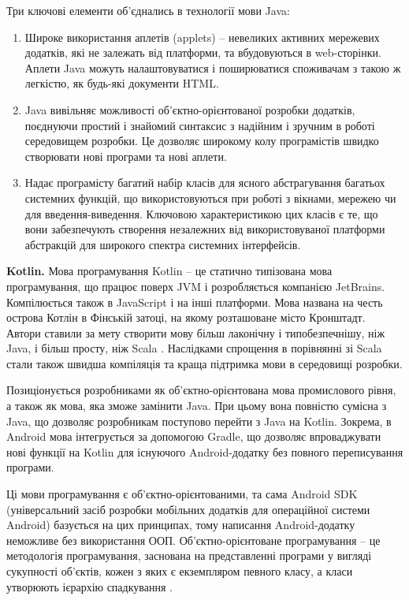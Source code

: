\documentclass[../main.tex]{subfiles}
\begin{document}
Три ключові елементи об'єднались в технології мови Java:
\begin{enumerate}
	\item Широке використання аплетів (applets) -- невеликих активних мережевих додатків, які не залежать від платформи, та вбудовуються в web-сторінки. Аплети Java можуть налаштовуватися і поширюватися споживачам з такою ж легкістю, як будь-які документи HTML.
	\item Java вивільняє можливості об'єктно-орієнтованої розробки додатків, поєднуючи простий і знайомий синтаксис з надійним і зручним в роботі середовищем розробки. Це дозволяє широкому колу програмістів швидко створювати нові програми та нові аплети.
	\item Надає програмісту багатий набір класів для ясного абстрагування багатьох системних функцій, що використовуються при роботі з вікнами, мережею чи для введення-виведення. Ключовою характеристикою цих класів є те, що вони забезпечують створення незалежних від використовуваної платформи абстракцій для широкого спектра системних інтерфейсів.
\end{enumerate}

{\bfseries{Kotlin.}}
Мова програмування Kotlin -- це статично типізована мова програмування, що працює поверх JVM і розробляється компанією JetBrains. Компілюється також в JavaScript і на інші платформи. Мова названа на честь острова Котлін в Фінській затоці, на якому розташоване місто Кронштадт. Автори ставили за мету створити мову більш лаконічну і типобезпечнішу, ніж Java, і більш просту, ніж Scala \cite{open_systems}. Наслідками спрощення в порівнянні зі Scala стали також швидша компіляція та краща підтримка мови в середовищі розробки.

Позиціонується розробниками як об'єктно-орієнтована мова промислового рівня, а також як мова, яка зможе замінити Java. При цьому вона повністю сумісна з Java, що дозволяє розробникам поступово перейти з Java на Kotlin. Зокрема, в Android мова інтегрується за допомогою Gradle, що дозволяє впроваджувати нові функції на Kotlin для існуючого Android-додатку без повного переписування програми.

Ці мови програмування є об'єктно-орієнтованими, та сама Android SDK (універсальний засіб розробки мобільних додатків для операційної системи Android) базується на цих принципах, тому написання Android-додатку неможливе без використання ООП. Об'єктно-орієнтоване програмування – це методологія програмування, заснована на представленні програми у вигляді сукупності об'єктів, кожен з яких є екземпляром певного класу, а класи утворюють ієрархію спадкування \cite{oop}.
\end{document}
